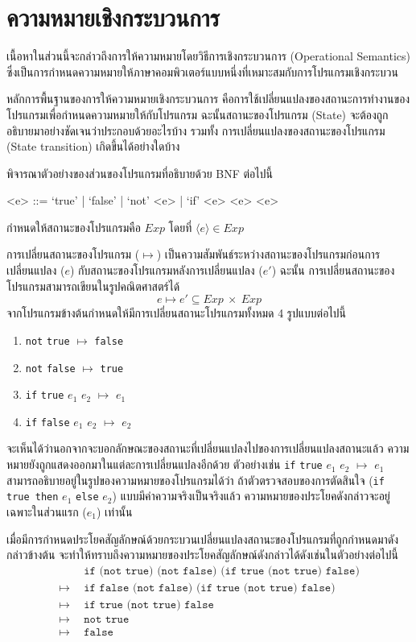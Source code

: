 \chapter{ความหมายเชิงกระบวนการ}
%
\par{
เนื้อหาในส่วนนี้จะกล่าวถึงการให้ความหมายโดยวิธีการเชิงกระบวนการ 
(Operational Semantics)
ซึ่งเป็นการกำหนดความหมายให้ภาษาคอมพิวเตอร์แบบหนึ่งที่เหมาะสมกับการโปรแกรมเชิงกระบวน
}
%
\par{
หลักการพื้นฐานของการให้ความหมายเชิงกระบวนการ 
คือการใช้เปลี่ยนแปลงของสถานะการทำงานของโปรแกรมเพื่อกำหนดความหมายให้กับโปรแกรม
ฉะนั้นสถานะของโปรแกรม (State) 
จะต้องถูกอธิบายมาอย่างชัดเจนว่าประกอบด้วยอะไรบ้าง 
รวมทั้ง การเปลี่ยนแปลงของสถานะของโปรแกรม (State transition) 
เกิดขึ้นได้อย่างใดบ้าง
}
%
\par{
\begin{example}
%
พิจารณาตัวอย่างของส่วนของโปรแกรมที่อธิบายด้วย BNF 
ต่อไปนี้
\begin{grammar}
<e> ::= `true' | `false' | `not' <e> | `if' <e> <e> <e>
\end{grammar}
\end{example}
}
%
กำหนดให้สถานะของโปรแกรมคือ $Exp$ โดยที่ 
$\langle e \rangle \in Exp$ 
%
\par{
การเปลี่ยนสถานะของโปรแกรม ($\mapsto$)
เป็นความสัมพันธ์ระหว่างสถานะของโปรแกรมก่อนการเปลี่ยนแปลง ($e$) 
กับสถานะของโปรแกรมหลังการเปลี่ยนแปลง ($e'$)
ฉะนั้น การเปลี่ยนสถานะของโปรแกรมสามารถเขียนในรูปคณิตศาสตร์ได้ 
$$
e \mapsto e' \subseteq Exp~\times~Exp
$$
จากโปรแกรมข้างต้นกำหนดให้มีการเปลี่ยนสถานะโปรแกรมทั้งหมด 4 รูปแบบต่อไปนี้
%
\begin{enumerate}
\item \texttt{not} \texttt{true} $\mapsto$ \texttt{false}
\item \texttt{not} \texttt{false} $\mapsto$ \texttt{true}
\item \texttt{if} \texttt{true} $e_1$ $e_2$ $\mapsto$ $e_1$
\item \texttt{if} \texttt{false} $e_1$ $e_2$ $\mapsto$ $e_2$
\end{enumerate}
%
จะเห็นได้ว่านอกจากจะบอกลักษณะของสถานะที่เปลี่ยนแปลงไปของการเปลี่ยนแปลงสถานะแล้ว 
ความหมายยังถูกแสดงออกมาในแต่ละการเปลี่ยนแปลงอีกด้วย ตัวอย่างเช่น
\texttt{if} \texttt{true} $e_1$ $e_2$ $\mapsto$ $e_1$
สามารถอธิบายอยู่ในรูปของความหมายของโปรแกรมได้ว่า 
ถ้าตัวตรวจสอบของการตัดสินใจ 
(\texttt{if true then} $e_1$ \texttt{else} $e_2$)
แบบมีค่าความจริงเป็นจริงแล้ว 
ความหมายของประโยคดังกล่าวจะอยู่เฉพาะในส่วนแรก ($e_1$) เท่านั้น
}
%
\par{
เมื่อมีการกำหนดประโยคสัญลักษณ์ด้วยกระบวนเปลี่ยนแปลงสถานะของโปรแกรมที่ถูกกำหนดมาดังกล่าวข้างต้น
จะทำให้ทราบถึงความหมายของประโยคสัญลักษณ์ดังกล่าวได้ดังเช่นในตัวอย่างต่อไปนี้
\begin{align*}
&~~\texttt{if (not true) (not false) (if true (not true) false)} \\
\mapsto &~~\texttt{if false (not false) (if true (not true) false)} \\
\mapsto &~~\texttt{if true (not true) false} \\
\mapsto &~~\texttt{not true} \\
\mapsto &~~\texttt{false} 
\end{align*}
}
